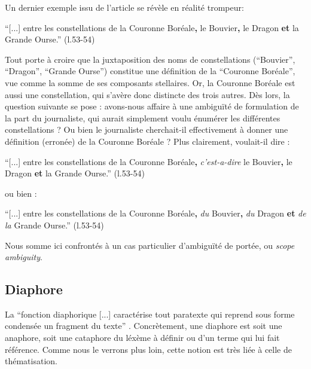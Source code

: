 \documentclass[a4paper,10pt]{article}
\begin{document}
			Un dernier exemple issu de l'article se révèle en réalité trompeur:
			\begin{center}
				\footnotesize
				\begin{minipage}{0.7\textwidth}
					``[...] entre les constellations de la Couronne Boréale\textbf{,} le Bouvier\textbf{,} le Dragon \textbf{et} la Grande Ourse.'' (l.53-54)
				\end{minipage}
			\end{center}
			Tout porte à croire que la juxtaposition des noms de constellations (``Bouvier'', ``Dragon'', ``Grande Ourse'') constitue une définition de la ``Couronne Boréale'', vue comme la somme de ses composants stellaires. Or, la Couronne Boréale est aussi une constellation, qui s'avère donc distincte des trois autres. Dès lors, la question suivante se pose : avons-nous affaire à une ambiguïté de formulation de la part du journaliste, qui aurait simplement voulu énumérer les différentes constellations ? Ou bien le journaliste cherchait-il effectivement à donner une définition (erronée) de la Couronne Boréale ? Plus clairement, voulait-il dire :
			\begin{center}
				\footnotesize
				\begin{minipage}{0.7\textwidth}
					``[...] entre les constellations de la Couronne Boréale\textbf{,} \textit{c'est-a-dire} le Bouvier\textbf{,} le Dragon \textbf{et} la Grande Ourse.'' (l.53-54)
				\end{minipage}
			\end{center}
			ou bien :
			\begin{center}
				\footnotesize
				\begin{minipage}{0.7\textwidth}
					``[...] entre les constellations de la Couronne Boréale\textbf{,} \textit{du} Bouvier\textbf{,} \textit{du} Dragon \textbf{et} \textit{de la} Grande Ourse.'' (l.53-54)
				\end{minipage}
			\end{center}
			Nous somme ici confrontés à un cas particulier d'ambiguïté de portée, ou \textit{scope ambiguity}.
			
	\subsection{Diaphore} \label{diaphore}
		La ``fonction diaphorique [...] caractérise tout paratexte qui reprend sous forme condensée un fragment du texte'' \cite{Peraya1994}. Concrètement, une diaphore est soit une anaphore, soit une cataphore du léxème à définir ou d'un terme qui lui fait référence. Comme nous le verrons plus loin, cette notion est très liée à celle de thématisation.\\
\end{document}
